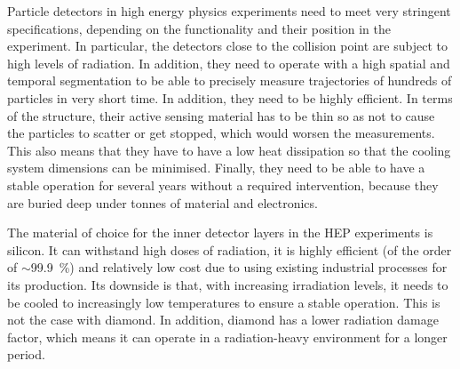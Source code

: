 



Particle detectors in high energy physics experiments need to meet very stringent specifications, depending on the functionality and their position in the experiment. In particular, the detectors close to the collision point are subject to high levels of radiation. In addition, they need to operate with a high spatial and temporal segmentation to be able to precisely measure trajectories of hundreds of particles in very short time. In addition, they need to be highly efficient. In terms of the structure, their active sensing material has to be thin so as not to cause the particles to scatter or get stopped, which would worsen the measurements. This also means that they have to have a low heat dissipation so that the cooling system dimensions can be minimised. Finally, they need to be able to have a stable operation for several years without a required intervention, because they are buried deep under tonnes of material and electronics. 

The material of choice for the inner detector layers in the HEP experiments is silicon. It can withstand high doses of radiation, it is highly efficient (of the order of $\sim$99.9~\%) and relatively low cost due to using existing industrial processes for its production. Its downside is that, with increasing irradiation levels, it needs to be cooled to increasingly low temperatures to ensure a stable operation. This is not the case with diamond. In addition, diamond has a lower radiation damage factor, which means it can operate in a radiation-heavy environment for a longer period.

